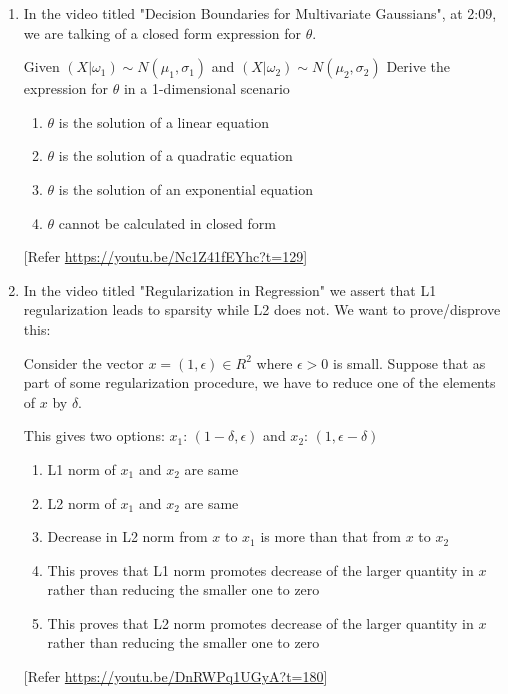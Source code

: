 \documentclass{article}
\begin{document}
\begin{enumerate}
    \item In the video titled "Decision Boundaries for Multivariate Gaussians", at 2:09, we are talking of a closed form expression for $\theta$.

    Given $(X\vert \omega_1)\sim N(\mu_1,\sigma_1)$ and $(X\vert \omega_2)\sim N(\mu_2,\sigma_2)$ Derive the expression for $\theta$ in a 1-dimensional scenario
    \begin{enumerate}
        \item $\theta$ is the solution of a linear equation
        \item $\theta$ is the solution of a quadratic equation
        \item $\theta$ is the solution of an exponential equation
        \item $\theta$ cannot be calculated in closed form
    \end{enumerate}
    [Refer \url{https://youtu.be/Nc1Z41fEYhc?t=129}]

    \item In the video titled "Regularization in Regression" we assert that L1 regularization leads to sparsity while L2 does not. We want to prove/disprove this:

    Consider the vector $x = (1,\epsilon)\in R^2$ where $\epsilon>0$ is small. Suppose that as part of some regularization procedure, we have to reduce one of the elements of $x$ by $\delta$.

    This gives two options: $x_1$: $(1-\delta,\epsilon)$ and $x_2$: $(1,\epsilon-\delta)$
    \begin{enumerate}
        \item L1 norm of $x_1$ and $x_2$ are same
        \item L2 norm of $x_1$ and $x_2$ are same
        \item Decrease in L2 norm from $x$ to $x_1$ is more than that from $x$ to $x_2$
        \item This proves that L1 norm promotes decrease of the larger quantity in $x$ rather than reducing the smaller one to zero
        \item This proves that L2 norm promotes decrease of the larger quantity in $x$ rather than reducing the smaller one to zero
    \end{enumerate}
    [Refer \url{https://youtu.be/DnRWPq1UGyA?t=180}]

\end{enumerate}
\end{document}
